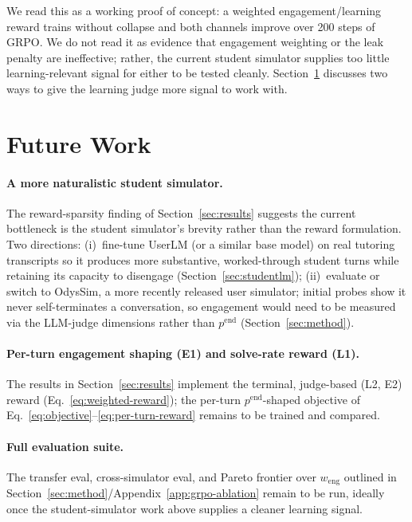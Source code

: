 \documentclass[11pt]{article}
\begin{document}
We read this as a working proof of concept: a weighted engagement/learning
reward trains without collapse and both channels improve over 200 steps of
GRPO. We do not read it as evidence that engagement weighting or the leak
penalty are ineffective; rather, the current student simulator supplies too
little learning-relevant signal for either to be tested cleanly. Section~\ref{sec:future} discusses two ways to give the learning judge more signal to work with.

\section{Future Work}
\label{sec:future}

\paragraph{A more naturalistic student simulator.} The reward-sparsity finding
of Section~\ref{sec:results} suggests the current bottleneck is the student
simulator's brevity rather than the reward formulation. Two directions:
(i)~fine-tune UserLM (or a similar base model) on real tutoring transcripts so
it produces more substantive, worked-through student turns while retaining
its capacity to disengage (Section~\ref{sec:studentlm}); (ii)~evaluate or
switch to OdysSim, a more recently released user simulator; initial probes
show it never self-terminates a conversation, so engagement would need to be
measured via the LLM-judge dimensions rather than $p^{\text{end}}$
(Section~\ref{sec:method}).

\paragraph{Per-turn engagement shaping (E1) and solve-rate reward (L1).} The
results in Section~\ref{sec:results} implement the terminal, judge-based (L2,
E2) reward (Eq.~\ref{eq:weighted-reward}); the per-turn $p^{\text{end}}$-shaped
objective of Eq.~\ref{eq:objective}--\ref{eq:per-turn-reward} remains to be
trained and compared.

\paragraph{Full evaluation suite.} The transfer eval, cross-simulator eval, and
Pareto frontier over $w_{\text{eng}}$ outlined in
Section~\ref{sec:method}/Appendix~\ref{app:grpo-ablation} remain to be run,
ideally once the student-simulator work above supplies a cleaner learning
signal.
\end{document}
